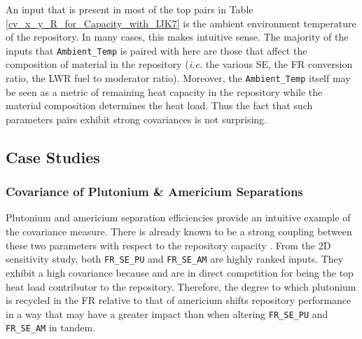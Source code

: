 An input that is present in most of the top pairs in Table \ref{cv_x_y_R_for_Capacity_with_IJK7} is the
ambient environment temperature of the repository.
In many cases, this makes intuitive sense.  The majority of the inputs that 
\texttt{Ambient\_Temp} is paired with here are those that affect the composition of
material in the repository (\emph{i.e.} the various SE, the FR conversion ratio, 
the LWR fuel to moderator ratio).
Moreover, the \texttt{Ambient\_Temp} itself may be seen as a metric of remaining 
heat capacity in the repository while the material composition determines the heat load.
Thus the fact that such parameters pairs exhibit strong covariances is not surprising.



\subsection{Case Studies}
\label{cts_sec:case_studies}

\subsubsection{Covariance of Plutonium \& Americium Separations}
\label{cts_sec:pu_am_se}

Plutonium and americium separation efficiencies provide an intuitive example of 
the covariance measure.  There is already known
to be a strong coupling between these two parameters with respect to the repository 
capacity \cite{Scopatz2009c}.  From the
2D sensitivity study, both \texttt{FR\_SE\_PU} and \texttt{FR\_SE\_AM} are highly 
ranked inputs.  They exhibit
a high covariance because  and  are in direct competition 
for being the top heat load contributor to the
repository.  Therefore, the degree to which plutonium is recycled in the FR relative 
to that of americium shifts
repository performance in a way that may have a greater impact than when altering 
\texttt{FR\_SE\_PU} and \texttt{FR\_SE\_AM}
in tandem.

